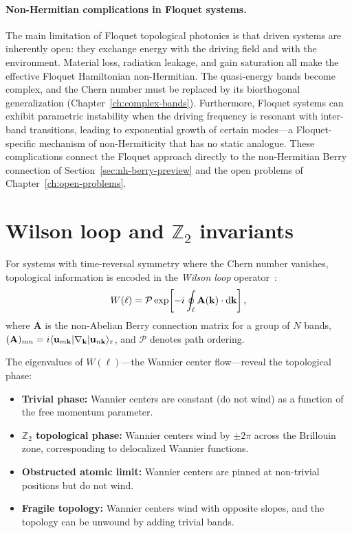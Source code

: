 \paragraph{Non-Hermitian complications in Floquet systems.}
The main limitation of Floquet topological photonics is that
driven systems are inherently open: they exchange energy with the
driving field and with the environment. Material loss, radiation
leakage, and gain saturation all make the effective Floquet Hamiltonian
non-Hermitian. The quasi-energy bands become complex, and the Chern
number must be replaced by its biorthogonal generalization
(Chapter~\ref{ch:complex-bands}). Furthermore, Floquet systems can
exhibit parametric instability when the driving frequency is resonant
with inter-band transitions, leading to exponential growth of certain
modes---a Floquet-specific mechanism of non-Hermiticity that has no
static analogue. These complications connect the Floquet approach
directly to the non-Hermitian Berry connection of
Section~\ref{sec:nh-berry-preview} and the open problems of
Chapter~\ref{ch:open-problems}.


\section{Wilson loop and $\mathbb{Z}_2$ invariants}
\label{sec:wilson-loop}

For systems with time-reversal symmetry where the Chern number vanishes,
topological information is encoded in the \emph{Wilson loop}
operator~\cite{paz2019tutorial}:
\begin{equation}
 W(\ell) = \mathcal{P}\exp\!\left[-i\oint_\ell
 \mathbf{A}(\mathbf{k})\cdot\mathop{}\!\mathrm{d}\mathbf{k}\right],
 \label{eq:wilson-loop}
\end{equation}
where $\mathbf{A}$ is the non-Abelian Berry connection matrix for a group
of $N$ bands, $(\mathbf{A})_{mn} = i\langle\mathbf{u}_{m\mathbf{k}}|\nabla_{\mathbf{k}}|\mathbf{u}_{n\mathbf{k}}\rangle_\varepsilon$,
and $\mathcal{P}$ denotes path ordering.

The eigenvalues of $W(\ell)$---the Wannier center flow---reveal the
topological phase:
\begin{itemize}
 \item \textbf{Trivial phase:} Wannier centers are constant (do not
 wind) as a function of the free momentum parameter.
 \item \textbf{$\mathbb{Z}_2$ topological phase:} Wannier centers wind
 by $\pm 2\pi$ across the Brillouin zone, corresponding to
 delocalized Wannier functions.
 \item \textbf{Obstructed atomic limit:} Wannier centers are pinned at
 non-trivial positions but do not wind.
 \item \textbf{Fragile topology:} Wannier centers wind with opposite
 slopes, and the topology can be unwound by adding trivial bands.
\end{itemize}


